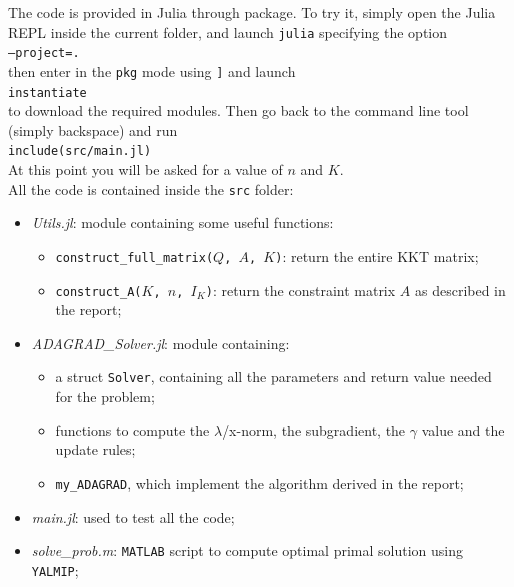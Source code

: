 \documentclass[notitlepage]{article}
\begin{document}
The code is provided in Julia through package. To try it, simply open the Julia REPL inside the current folder, and launch \texttt{julia} specifying the option\\[0.2ex]
\hspace*{0.5ex}\hspace{0.5ex}\hspace{0.5ex}\texttt{--project=.}\\[0.2ex]
then enter in the \texttt{pkg} mode using \texttt{]} and launch\\[0.2ex]
\hspace*{0.5ex}\hspace{0.5ex}\hspace{0.5ex}\texttt{instantiate}\\[0.2ex]
to download the required modules. Then go back to the command line tool (simply backspace) and run\\[0.2ex]
\hspace*{0.5ex}\hspace{0.5ex}\hspace{0.5ex}\texttt{include(src/main.jl)}\\[0.2ex]
At this point you will be asked for a value of $n$ and $K$.\\
All the code is contained inside the \texttt{src} folder:
\begin{itemize}
  \item \textit{Utils.jl}: module containing some useful functions:
  \begin{itemize}
    \item \texttt{construct\_full\_matrix($Q$, $A$, $K$)}: return the entire KKT matrix;
    \item \texttt{construct\_A($K$, $n$, $I_K$)}: return the constraint matrix $A$ as described in the report;
  \end{itemize}
  \item \textit{ADAGRAD\_Solver.jl}: module containing:
  \begin{itemize}
    \item a struct \texttt{Solver}, containing all the parameters and return value needed for the problem;
    \item functions to compute the $\lambda$/x-norm, the subgradient, the $\gamma$ value and the update rules;
    \item \texttt{my\_ADAGRAD}, which implement the algorithm derived in the report;
  \end{itemize}
  \item \textit{main.jl}: used to test all the code;
  \item \textit{solve\_prob.m}: \texttt{MATLAB} script to compute optimal primal solution using \texttt{YALMIP};
\end{itemize}
\end{document}
